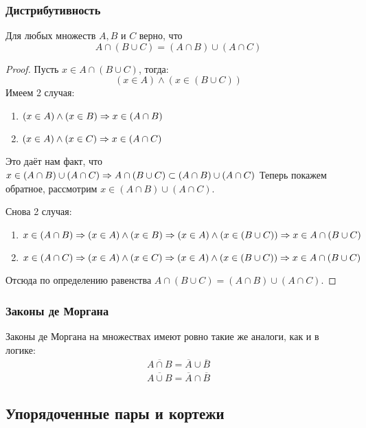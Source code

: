 \subsubsection{Дистрибутивность}

\begin{proposition}
	Для любых множеств $A, B$ и $C$ верно, что
	$$
		A \cap (B \cup C) = (A \cap B) \cup (A \cap C)
	$$
\end{proposition}

\begin{proof}
	Пусть $x \in A \cap (B \cup C)$, тогда:
	$$
	(x \in A) \wedge (x \in (B \cup C))
	$$
	Имеем 2 случая:
	\begin{enumerate}
		\item $(x \in A) \wedge (x \in B) \Rightarrow x \in (A \cap B)$
		\item $(x \in A) \wedge (x \in C) \Rightarrow x \in (A \cap C)$
	\end{enumerate}
	Это даёт нам факт, что $x \in (A \cap B) \cup (A \cap C) \Rightarrow A \cap (B \cup C) \subset (A \cap B) \cup (A \cap C)$
	Теперь покажем обратное, рассмотрим $x \in (A \cap B) \cup (A \cap C)$.
	
	Снова 2 случая:
	\begin{enumerate}
		\item $x \in (A \cap B) \Rightarrow (x \in A) \wedge (x \in B) \Rightarrow (x \in A) \wedge (x \in (B \cup C)) \Rightarrow x \in A \cap (B \cup C)$
		\item $x \in (A \cap C) \Rightarrow (x \in A) \wedge (x \in C) \Rightarrow (x \in A) \wedge (x \in (B \cup C)) \Rightarrow x \in A \cap (B \cup C)$
	\end{enumerate}

	Отсюда по определению равенства $A \cap (B \cup C) = (A \cap B) \cup (A \cap C)$.
\end{proof}

\subsubsection{Законы де Моргана}

Законы де Моргана на множествах имеют ровно такие же аналоги, как и в логике:
\begin{align*}
	\overline{A \cap B} = \overline{A} \cup \overline{B}
	\\
	\overline{A \cup B} = \overline{A} \cap \overline{B}
\end{align*}

\subsection{Упорядоченные пары и кортежи}

